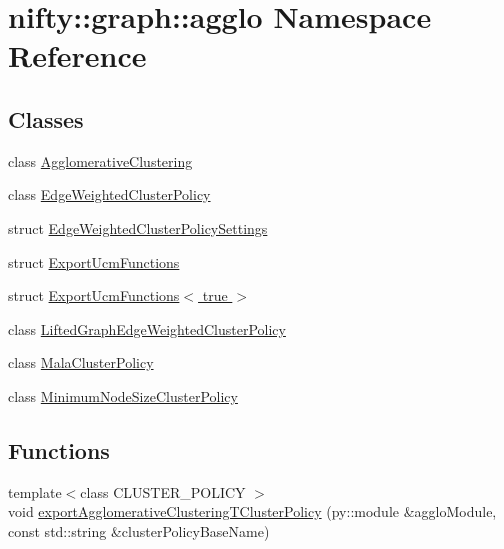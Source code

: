 \hypertarget{namespacenifty_1_1graph_1_1agglo}{}\section{nifty\+:\+:graph\+:\+:agglo Namespace Reference}
\label{namespacenifty_1_1graph_1_1agglo}
\subsection*{Classes}
\begin{DoxyCompactItemize}
\item 
class \hyperlink{classnifty_1_1graph_1_1agglo_1_1AgglomerativeClustering}{Agglomerative\+Clustering}
\item 
class \hyperlink{classnifty_1_1graph_1_1agglo_1_1EdgeWeightedClusterPolicy}{Edge\+Weighted\+Cluster\+Policy}
\item 
struct \hyperlink{structnifty_1_1graph_1_1agglo_1_1EdgeWeightedClusterPolicySettings}{Edge\+Weighted\+Cluster\+Policy\+Settings}
\item 
struct \hyperlink{structnifty_1_1graph_1_1agglo_1_1ExportUcmFunctions}{Export\+Ucm\+Functions}
\item 
struct \hyperlink{structnifty_1_1graph_1_1agglo_1_1ExportUcmFunctions_3_01true_01_4}{Export\+Ucm\+Functions$<$ true $>$}
\item 
class \hyperlink{classnifty_1_1graph_1_1agglo_1_1LiftedGraphEdgeWeightedClusterPolicy}{Lifted\+Graph\+Edge\+Weighted\+Cluster\+Policy}
\item 
class \hyperlink{classnifty_1_1graph_1_1agglo_1_1MalaClusterPolicy}{Mala\+Cluster\+Policy}
\item 
class \hyperlink{classnifty_1_1graph_1_1agglo_1_1MinimumNodeSizeClusterPolicy}{Minimum\+Node\+Size\+Cluster\+Policy}
\end{DoxyCompactItemize}
\subsection*{Functions}
\begin{DoxyCompactItemize}
\item 
{\footnotesize template$<$class C\+L\+U\+S\+T\+E\+R\+\_\+\+P\+O\+L\+I\+C\+Y $>$ }\\void \hyperlink{namespacenifty_1_1graph_1_1agglo_ac1f80b0263547645d7f6603e7a094bd1}{export\+Agglomerative\+Clustering\+T\+Cluster\+Policy} (py\+::module \&agglo\+Module, const std\+::string \&cluster\+Policy\+Base\+Name)
\end{DoxyCompactItemize}


